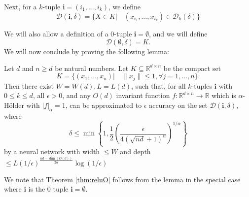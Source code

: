 \documentclass[twoside,11pt]{article}
\newcommand{\RR}{\mathbb{R}}
\begin{document}
Next, for a $k$-tuple $\mathbf{i}=(i_1,\ldots,i_k)$, we define 
$$\mathcal{D}(\mathbf{i},\delta)=\{X\in K| \quad  (x_{i_1},\ldots,x_{i_k}) \in \mathcal{D}_k(\delta)\} $$

We will also allow a definition of a $0$-tuple $\mathbf{i}=\emptyset $, and we will define 
$$\mathcal{D}(\emptyset,\delta)=K. $$
We will now conclude by proving the following lemma:
\begin{lem}
Let $d$ and $n\geq d$ be natural numbers. Let $K\subseteq \RR^{d\times n}$ be the compact set 
$$K=\{(x_1,\ldots,x_n)| \quad \|x_j\| \leq 1, \forall j=1,\ldots,n\} .$$
Then there exist $W=W(d),L=L(d)$, such that, for all $k$-tuples $\mathbf{i} $ with $0\leq k \leq d $, all $\epsilon>0$, and any $O(d)$ invariant function $f:\RR^{d\times n}\to \RR$ which is $\alpha$-H\"older with $|f|_\alpha=1$,  can be approximated to $\epsilon$ accuracy on the set $\mathcal{D}(\mathbf{i},\delta)$, where
\begin{equation}\label{eq:delta} \delta \leq \min\left \{1, \frac{1}{2}\left(\frac{\epsilon}{4(\sqrt{nd}+1)^\alpha} \right)^{1/\alpha}  \right \}
\end{equation}
by a neural network with width $\leq W$ and depth $\leq L(1/\epsilon)^{\frac{nd-\dim(O(d))}{2\alpha}}\log(1/\epsilon)$
\end{lem}
We note that Theorem \ref{thm:reluO} follows from the lemma in the special case where $\mathbf{i}$ is the $0$ tuple $\mathbf{i}=\emptyset$.
\end{document}

